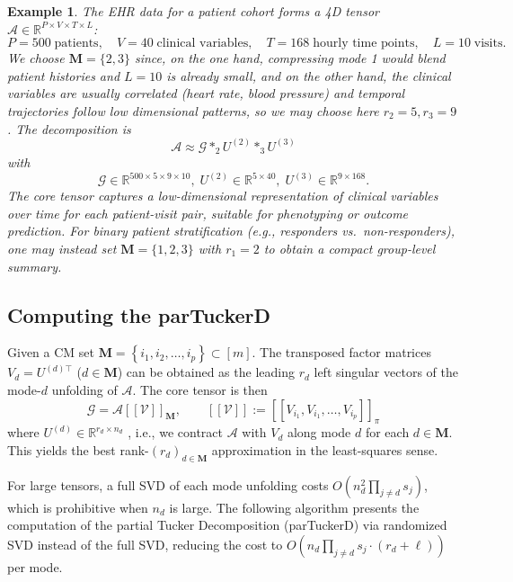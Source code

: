 \documentclass[11pt, oneside]{article}  %
\newtheorem{exm}[thm]{Example}
\newcommand{\dsb}[1]{[\![#1]\!]}
\newcommand{\set}[1]{\left\{#1\right\}}
\newcommand{\RR}{\mathbb{R}}
\newcommand{\A}{\mathcal{A}}
\newcommand{\caG}{\mathcal{G}}
\newcommand{\caM}{\mathbf{M}}
\newcommand{\V}{\mathcal{V}}
\newcommand{\beq}{\begin{equation}}
\newcommand{\eeq}{\end{equation}}
\begin{document}
\begin{exm}\label{exm5-2}
The EHR data for a patient cohort forms a 4D tensor $\A\in\RR^{P\times V\times T\times L}$:
\[
P=500\;\text{patients},\quad V=40\;\text{clinical variables},\quad T=168\;\text{hourly time points},\quad L=10\;\text{visits}.
\]
We choose $\caM=\{2,3\}$ since, on the one hand, compressing mode 1 would blend patient histories and $L=10$ is already small, and on the 
other hand, the clinical variables are usually correlated (heart rate, blood pressure) and temporal trajectories follow low dimensional patterns, so 
we may choose here $r_2 = 5,  r_3 = 9$.  The decomposition is 
\[
\A\approx\caG\ast_2 U^{(2)}\ast_3 U^{(3)}
\]
with 
\[
\caG\in\RR^{500\times5\times9\times10},\; U^{(2)}\in\RR^{5\times40},\;  U^{(3)}\in\RR^{9\times168}.
\]
The core tensor captures a low-dimensional representation of clinical variables over time for each patient-visit pair, suitable for phenotyping or 
outcome prediction.  For binary patient stratification (e.g., responders vs.\ non-responders), one may instead set $\caM=\{1,2,3\}$ with $r_1=2$ 
to obtain a compact group-level summary.
\end{exm}

\subsection{Computing the parTuckerD}
\label{sec5-3}

Given a CM set $\caM=\set{i_1,i_2,\ldots, i_p}\subset [m]$. The transposed factor matrices $V_{d}=U^{(d)\top}$ ($d\in\caM$) can be obtained 
as the leading $r_d$ left singular vectors of the mode-$d$ unfolding of $\A$.  The core tensor is then
\beq\label{eq5-3-1:core-t}
\caG = \A\dsb{\V}_{\caM}, \qquad \dsb{\V}:=\dsb{V_{i_1},V_{i_1}, \ldots, V_{i_p}}_{\pi}
\eeq
where $U^{(d)}\in\RR^{r_{d}\times n_{d}}$ , i.e., we contract $\A$ with $V_{d}$ along mode $d$ for each $d\in\caM$.  This yields 
the best rank-$(r_d)_{d\in\caM}$ approximation in the least-squares sense. 

For large tensors, a full SVD of each mode unfolding costs $O(n_d^2\prod_{j\neq d}s_j)$, which is prohibitive when $n_d$ is large.  The 
following algorithm presents the computation of the partial Tucker Decomposition (parTuckerD) via randomized SVD instead of the full SVD,
reducing the cost to $O(n_d\prod_{j\neq d}s_j\cdot(r_d+\ell))$ per mode.
\end{document}
